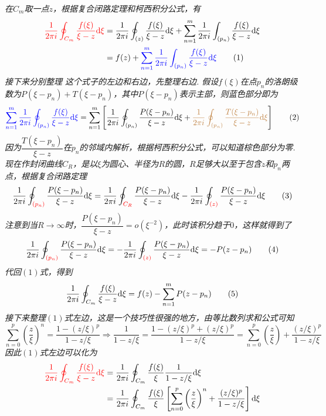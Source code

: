 \textit{
在\(C_m\)取一点\(z\)，根据复合闭路定理和柯西积分公式，有
\begin{align}
    {\color{red} \frac{1}{2\pi i}\oint_{C_m}\frac{f(\xi)}{\xi-z}{\rm d}\xi} &= 
    \frac{1}{2\pi i}\oint_{(z)}\frac{f(\xi)}{\xi-z}{\rm d}\xi
    +\sum_{n=1}^m\frac{1}{2\pi i}\int_{(p_n)}\frac{f(\xi)}{\xi-z}{\rm d}\xi \notag \\ 
    &= f(z) + {\color{blue}\sum_{n=1}^m\frac{1}{2\pi i}\int_{(p_n)}\frac{f(\xi)}{\xi-z}{\rm d}\xi} \tag{1}
\end{align} 
接下来分别整理 这个式子的左边和右边，先整理右边. 假设\(f(\xi)\)在点\(p_n\)的洛朗级数为\(P(\xi-p_n)+T(\xi-p_n)\)，其中\(P(\xi-p_n)\)表示主部，则蓝色部分即为
\[{\color{blue}\sum_{n=1}^m\frac{1}{2\pi i}\oint_{(p_n)}\frac{f(\xi)}{\xi-z}{\rm d}\xi} = 
\sum_{n=1}^m\left[\frac{1}{2\pi i}\oint_{(p_n)}\frac{P(\xi-p_n)}{\xi-z}{\rm d}\xi
+{\color{brown}\frac{1}{2\pi i}\oint_{(p_n)}\frac{T(\xi-p_n)}{\xi-z}{\rm d}\xi}\right] 
\tag{2}\]
因为\(\dfrac{T(\xi-p_n)}{\xi-z}\)在\(p_n\)的邻域内解析，根据柯西积分公式，可以知道棕色部分为零. 现在作封闭曲线\(C_R\)，是以\(\xi\)为圆心、半径为\(R\)的圆，\(R\)足够大以至于包含\(z\)和\(p_n\)两点，根据复合闭路定理
\[\frac{1}{2\pi i}\oint_{\color{red}(p_n)}\frac{P(\xi-p_n)}{\xi-z}{\rm d}\xi = 
\frac{1}{2\pi i}\oint_{\color{red}C_R}\frac{P(\xi-p_n)}{\xi-z}{\rm d}\xi 
- \frac{1}{2\pi i}\oint_{\color{red}(z)}\frac{P(\xi-p_n)}{\xi-z}{\rm d}\xi
\tag{3}\]
注意到当\(R\to\infty\)时，\(\dfrac{P(\xi-p_n)}{\xi-z}=o(\xi^{-2})\)，此时该积分趋于\(0\)，这样就得到了
\[\frac{1}{2\pi i}\oint_{\color{red}(p_n)}\frac{P(\xi-p_n)}{\xi-z}{\rm d}\xi = -\frac{1}{2\pi i}\oint_{\color{red}(z)}\frac{P(\xi-p_n)}{\xi-z}{\rm d}\xi = -P(z-p_n)\tag{4}\]
代回\((1)\)式，得到
\[\frac{1}{2\pi i}\oint_{C_m}\frac{f(\xi)}{\xi-z}{\rm d}\xi = f(z) - \sum_{n=1}^{m}P(z-p_n) \tag{5}\]
接下来整理\((1)\)式左边，这是一个技巧性很强的地方，由等比数列求和公式可知
\[\sum_{n=0}^{p}\left(\frac{z}{\xi}\right)^n = \frac{1-(z/\xi)^p}{1-z/\xi} \Longrightarrow \frac{1}{1-z/\xi} = \frac{1-(z/\xi)^p+(z/\xi)^p}{1-z/\xi} = \sum_{n=0}^{p}\left(\frac{z}{\xi}\right)+\frac{(z/\xi)^p}{1-z/\xi}\]
因此\((1)\)式左边可以化为
\begin{align}
    {\color{red} \frac{1}{2\pi i}\oint_{C_m}\frac{f(\xi)}{\xi-z}\trm{d}\xi} &= 
    \frac{1}{2\pi i}\oint_{C_m}\frac{f(\xi)}{\xi}\frac{1}{1-z/\xi}\trm{d}\xi \notag \\
    &= \frac{1}{2\pi i}\oint_{C_m}\frac{f(\xi)}{\xi}\left[\sum_{n=0}^{p}\left(\frac{z}{\xi}\right)^n+\frac{(z/\xi)^p}{1-z/\xi}\right]\trm{d}\xi \notag \\

\end{align}}
